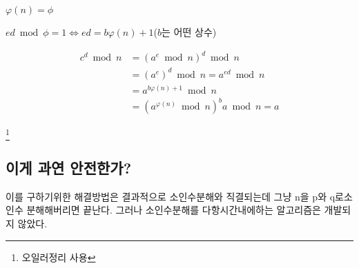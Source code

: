 $ \varphi(n) = \phi$

$ ed\bmod \phi =1 \Longleftrightarrow ed = b\varphi(n)+1$($b$는 어떤 상수)

\begin{align*}
  c^d \bmod n &=(a^e \bmod n)^d \bmod n \\ 
  &=(a^e)^d \bmod n = a^{ed} \bmod n \\
  &=  a^{b\varphi(n)+1}\bmod n  \\
  &= (a^{\varphi(n)} \bmod n)^{b} a \bmod n =a  
\end{align*}

\footnote{오일러정리 사용}

\subsection{이게 과연 안전한가?}


이를 구하기위한 해결방법은 결과적으로 소인수분해와 직결되는데 그냥 n을 p와 q로소인수 분해해버리면 끝난다. 그러나 소인수분해를 다항시간내에하는 알고리즘은 개발되지 않았다.

